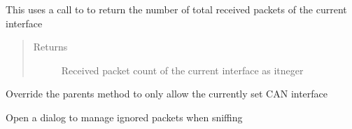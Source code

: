 \documentclass[letterpaper,10pt,english]{sphinxmanual}
\begin{document}
\begin{fulllineitems}
\begin{fulllineitems}
\begin{quote}
\begin{description}
\end{description}\end{quote}

\end{fulllineitems}


\begin{fulllineitems}
\label{\detokenize{src:src.SnifferTabElement.SnifferTabElement.getPacketCount}}
This uses a call to  to return the number
of total received packets of the current interface
\begin{quote}\begin{description}
\item[{Returns}] \leavevmode
Received packet count of the current interface as itneger

\end{description}\end{quote}

\end{fulllineitems}


\begin{fulllineitems}
\label{\detokenize{src:src.SnifferTabElement.SnifferTabElement.handleInterfaceSettingsDialog}}
Override the parents method to only allow the currently set CAN interface

\end{fulllineitems}


\begin{fulllineitems}
\label{\detokenize{src:src.SnifferTabElement.SnifferTabElement.handleManageIgnoredPacketsDialog}}
Open a dialog to manage ignored packets when sniffing

\end{fulllineitems}



\end{fulllineitems}
\end{document}
